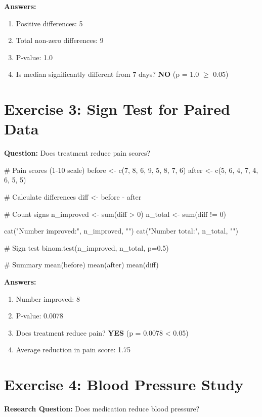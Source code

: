 \documentclass[11pt]{article}
\begin{document}
\textbf{Answers:}
\begin{enumerate}
\item \textcolor{answergreen}{Positive differences: 5}
\item \textcolor{answergreen}{Total non-zero differences: 9}
\item \textcolor{answergreen}{P-value: 1.0}
\item \textcolor{answergreen}{Is median significantly different from 7 days? \textbf{NO} (p = 1.0 $\geq$ 0.05)}
\end{enumerate}

\section{Exercise 3: Sign Test for Paired Data}

\textbf{Question:} Does treatment reduce pain scores?

\begin{rcode}
# Pain scores (1-10 scale)
before <- c(7, 8, 6, 9, 5, 8, 7, 6)
after <- c(5, 6, 4, 7, 4, 6, 5, 5)

# Calculate differences
diff <- before - after

# Count signs
n_improved <- sum(diff > 0)
n_total <- sum(diff != 0)

cat("Number improved:", n_improved, "\n")
cat("Number total:", n_total, "\n")

# Sign test
binom.test(n_improved, n_total, p=0.5)

# Summary
mean(before)
mean(after)
mean(diff)
\end{rcode}

\textbf{Answers:}
\begin{enumerate}
\item \textcolor{answergreen}{Number improved: 8}
\item \textcolor{answergreen}{P-value: 0.0078}
\item \textcolor{answergreen}{Does treatment reduce pain? \textbf{YES} (p = 0.0078 < 0.05)}
\item \textcolor{answergreen}{Average reduction in pain score: 1.75}
\end{enumerate}

\section{Exercise 4: Blood Pressure Study}

\textbf{Research Question:} Does medication reduce blood pressure?
\end{document}
